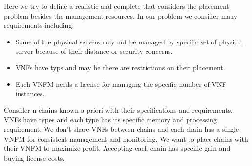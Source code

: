 \par
Here we try to define a realistic and complete that considers the placement problem besides the management resources.
In our problem we consider many requirements including:

\begin{itemize}
    \item Some of the physical servers may not be managed by specific set of physical server because of their distance or security concerns.
    \item VNFs have typs and may be there are restrictions on their placement.
    \item Each VNFM needs a license for managing the specific number of VNF instances.
\end{itemize}

\par
Consider n chains known a priori with their specifications and requirements.
VNFs have types and each type has its specific memory and processing requirement.
We don't share VNFs between chains and each chain has a single VNFM for consistent management and monitoring.
We want to place chains with their VNFM to maximize profit. Accepting each chain has specific gain and buying license costs.
